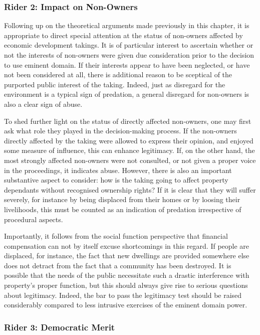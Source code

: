 \subsubsection*{Rider 2: Impact on Non-Owners}

Following up on the theoretical arguments made previously in this chapter, it is appropriate to direct special attention at the status of non-owners affected by economic development takings. It is of particular interest to ascertain whether or not the interests of non-owners were given due consideration prior to the decision to use eminent domain. If their interests appear to have been neglected, or have not been considered at all, there is additional reason to be sceptical of the purported public interest of the taking. Indeed, just as disregard for the environment is a typical sign of predation, a general disregard for non-owners is also a clear sign of abuse.

To shed further light on the status of directly affected non-owners, one may first ask what role they played in the decision-making process. If the non-owners directly affected by the taking were allowed to express their opinion, and enjoyed some measure of influence, this can enhance legitimacy. If, on the other hand, the most strongly affected non-owners were not consulted, or not given a proper voice in the proceedings, it indicates abuse. However, there is also an important substantive aspect to consider: how is the taking going to affect property dependants without recognised ownership rights? If it is clear that they will suffer severely, for instance by being displaced from their homes or by loosing their livelihoods, this must be counted as an indication of predation irrespective of procedural aspects. 

Importantly, it follows from the social function perspective that financial compensation can not by itself excuse shortcomings in this regard. If people are displaced, for instance, the fact that new dwellings are provided somewhere else does not detract from the fact that a community has been destroyed. It is possible that the needs of the public necessitate such a drastic interference with property's proper function, but this should always give rise to serious questions about legitimacy. Indeed, the bar to pass the legitimacy test should be raised considerably compared to less intrusive exercises of the eminent domain power.

\subsubsection*{Rider 3: Democratic Merit}

